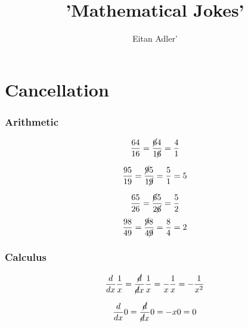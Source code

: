 \documentclass{article}
\title{'Mathematical Jokes'}
\author{Eitan Adler'}
\begin{document}
\maketitle


\section{Cancellation}
\subsubsection{Arithmetic}

\begin{equation}
	\begin{split}
		\frac{64}{16}
		=
		\frac{\cancel{6}4}{1\cancel{6}}
		=
		\frac{4}{1}
	\end{split}
\end{equation}

\begin{equation}
	\begin{split}
		\frac{95}{19}
		=
		\frac{\cancel{9}5}{1\cancel{9}}
		=
		\frac{5}{1}
		=
		5
	\end{split}
\end{equation}

\begin{equation}
	\begin{split}
		\frac{65}{26}
		=
		\frac{\cancel{6}5}{2\cancel{6}}
		=
		\frac{5}{2}
	\end{split}
\end{equation}
\begin{equation}
	\begin{split}
		\frac{98}{49}
		=
		\frac{\cancel{9}8}{4\cancel{9}}
		=
		\frac{8}{4}
		=
		2
	\end{split}
\end{equation}

\subsubsection{Calculus}
\begin{equation}
	\begin{split}
		\frac{d}{dx}
		\frac{1}{x}
		=
		\frac{\cancel{d}}{\cancel{d}x}
		\frac{1}{x}
		=
		\frac{}{x}
		\frac{1}{x}
		=
		- \frac{1}{x^2}
	\end{split}
\end{equation}

\begin{equation}
	\begin{split}
		\frac{d}{dx} 0 =
		\frac{\cancel{d}}{\cancel{d}x} 0
		=
		-x0
		=
		0
	\end{split}
\end{equation}
\end{document}
